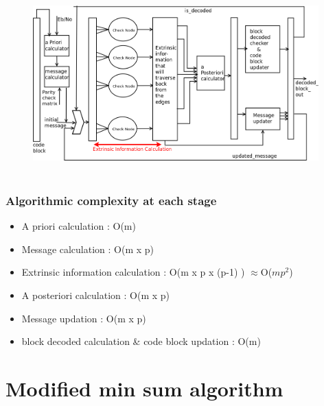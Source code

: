 \documentclass[xcolor=dvipsname]
{beamer}
\begin{document}
\begin{frame}[t]
\frametitle{  }  
\begin{figure}
       \includegraphics[height=7cm,width=11cm]{minSum}
       \end{figure}
\end{frame}

\begin{frame}[t]
\frametitle{ Algorithmic complexity at each stage }  
\begin{itemize}
\item A priori calculation	:	O(m) 
\item Message calculation 	:	O(m x p)
\item Extrinsic information calculation	: O(m x p x (p-1) ) $\approx $O($mp^{2}$)
\item A posteriori calculation : O(m x p)
\item Message updation : O(m x p)
\item block decoded calculation \& code block updation	: O(m)
\end{itemize}
\end{frame}


\section{Modified min sum algorithm}
\end{document}

